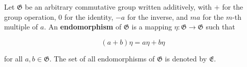 Let $\mathfrak{G}$ be an arbitrary commutative group written additively, with $+$ for the group operation, $0$ for the identity, $-a$ for the inverse, and $ma$ for the $m$-th multiple of $a$. An \textbf{endomorphism} of $\mathfrak{G}$ is a mapping $\eta : \mathfrak{G} \to \mathfrak{G}$ such that

$$(a + b)\eta = a\eta + b\eta$$

for all $a, b \in \mathfrak{G}$. The set of all endomorphisms of $\mathfrak{G}$ is denoted by $\mathfrak{E}$.
